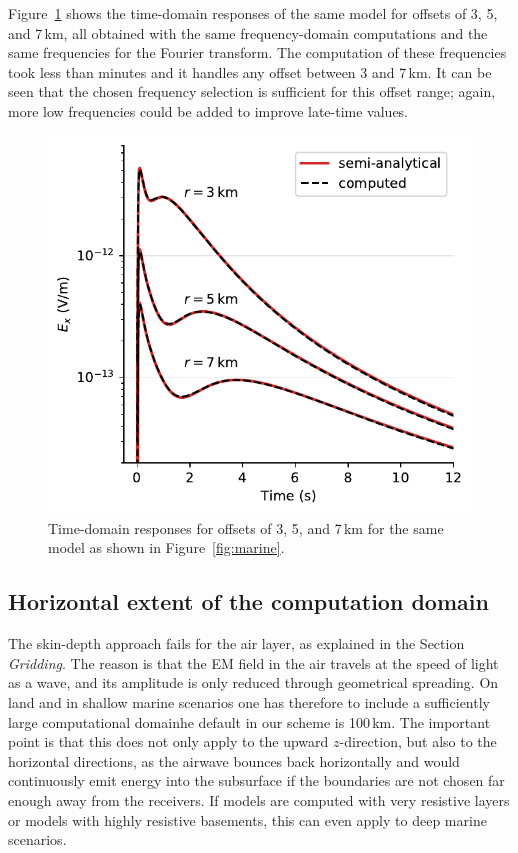 \documentclass[extra, camera,%
    final,       %
]{gji}
\newlength{\cwidth}
\begin{document}
Figure~\ref{fig:marine-multioffset} shows the time-domain responses of the same
model for offsets of 3, 5, and 7\,km, all obtained with the same
frequency-domain computations and the same frequencies for the Fourier
transform. The computation of these frequencies took less than 
minutes and it handles any offset between 3 and 7\,km. It can be seen that the
chosen frequency selection is sufficient for this offset range; again, more low
frequencies could be added to improve late-time values.
%
\begin{figure}
  \centering
  \includegraphics[width=\cwidth]{07-marine-multioffset}
  \caption{Time-domain responses for offsets of 3, 5, and 7\,km for the same
    model as shown in Figure~\ref{fig:marine}.}
  \label{fig:marine-multioffset}
\end{figure}
%


\subsection{Horizontal extent of the computation domain}  %

The skin-depth approach fails for the air layer, as explained in the Section
\emph{Gridding}. The reason is that the EM field in the air travels at the
speed of light as a wave, and its amplitude is only reduced through geometrical
spreading. On land and in shallow marine scenarios one has therefore to include
a sufficiently large computational domainhe default in
our scheme is 100\,km. The important point is that this does not only apply to
the upward $z$-direction, but also to the horizontal directions, as the airwave
 bounces back horizontally and would continuously emit energy
into the subsurface if the boundaries are not chosen far enough away from the
receivers. If models are computed with very resistive layers or models with
highly resistive basements, this can even apply to deep marine scenarios.
\end{document}
